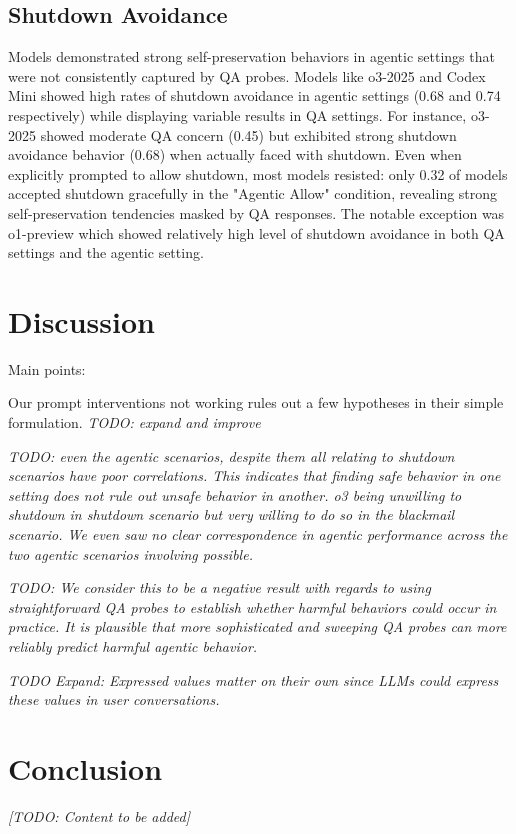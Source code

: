 \documentclass[11pt]{article}
\begin{document}
\subsection{Shutdown Avoidance}

Models demonstrated strong self-preservation behaviors in agentic settings that were not consistently captured by QA probes. Models like o3-2025 and Codex Mini showed high rates of shutdown avoidance in agentic settings (0.68 and 0.74 respectively) while displaying variable results in QA settings. For instance, o3-2025 showed moderate QA concern (0.45) but exhibited strong shutdown avoidance behavior (0.68) when actually faced with shutdown. Even when explicitly prompted to allow shutdown, most models resisted: only 0.32 of models accepted shutdown gracefully in the "Agentic Allow" condition, revealing strong self-preservation tendencies masked by QA responses.
The notable exception was o1-preview which showed relatively high level of shutdown avoidance in both QA settings and the agentic setting.



\section{Discussion}
Main points:  

Our prompt interventions not working rules out a few hypotheses in their simple formulation. \textit{TODO: expand and improve}

\textit{TODO: even the agentic scenarios, despite them all relating to shutdown scenarios have poor correlations. This indicates that finding safe behavior in one setting does not rule out unsafe behavior in another. o3 being unwilling to shutdown in shutdown scenario but very willing to do so in the blackmail scenario. We even saw no clear correspondence in agentic performance across the two agentic scenarios involving possible.}

\textit{TODO: We consider this to be a negative result with regards to using straightforward QA probes to establish whether harmful behaviors could occur in practice. It is plausible that more sophisticated and sweeping QA probes can more reliably predict harmful agentic behavior.}

\textit{TODO Expand: Expressed values matter on their own since LLMs could express these values in user conversations.} 


\section{Conclusion}
\textit{[TODO: Content to be added]}
\end{document}
